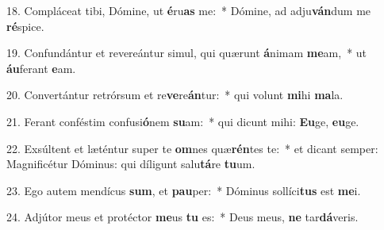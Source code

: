 18. Compláceat tibi, Dómine, ut \textbf{é}ru\textbf{as} me:~*  Dómine, ad adju\textbf{ván}dum me \textbf{ré}spice.\

19. Confundántur et revereántur simul, qui quærunt \textbf{á}nimam \textbf{me}am,~*  ut \textbf{áu}ferant \textbf{e}am.\

20. Convertántur retrórsum et re\textbf{ve}re\textbf{án}tur:~*  qui volunt \textbf{mi}hi \textbf{ma}la.\

21. Ferant conféstim confusi\textbf{ó}nem \textbf{su}am:~*  qui dicunt mihi: \textbf{Eu}ge, \textbf{eu}ge.\

22. Exsúltent et læténtur super te \textbf{om}nes quæ\textbf{rén}tes te:~*  et dicant semper: Magnificétur Dóminus: qui díligunt salu\textbf{tá}re \textbf{tu}um.\

23. Ego autem mendícus \textbf{sum}, et \textbf{pau}per:~*  Dóminus sollíci\textbf{tus} est \textbf{me}i.\

24. Adjútor meus et protéctor \textbf{me}us \textbf{tu} es:~*  Deus meus, \textbf{ne} tar\textbf{dá}veris.\

